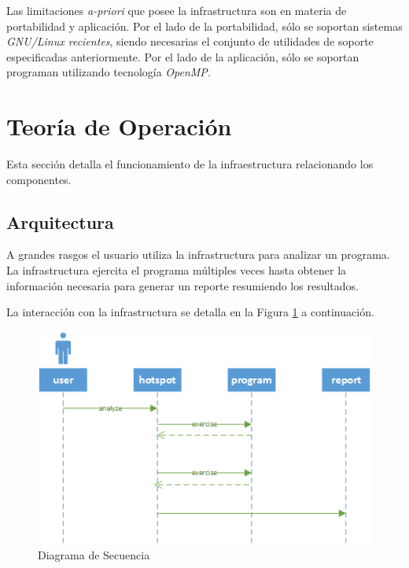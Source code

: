 \documentclass[a4paper]{report}
\begin{document}
\bigskip

Las limitaciones {\it a-priori} que posee la infrastructura son en materia de portabilidad y aplicación. Por el lado de la portabilidad, sólo se soportan sistemas {\it GNU/Linux recientes}, siendo necesarias el conjunto de utilidades de soporte especificadas anteriormente. Por el lado de la aplicación, sólo se soportan programan utilizando tecnología {\it OpenMP}.

\section{Teoría de Operación}

Esta sección detalla el funcionamiento de la infraestructura relacionando los componentes.

\subsection{Arquitectura}

A grandes rasgos el usuario utiliza la infrastructura para analizar un programa.
La infrastructura ejercita el programa múltiples veces hasta obtener la información necesaria para generar un reporte resumiendo los resultados.

\bigskip

La interacción con la infrastructura se detalla en la Figura \ref{fig:hotspot-seq} a continuación.

\begin{figure}[H]
\begin{center}
\includegraphics[width=\textwidth]{hotspot-seq.png}
\caption{Diagrama de Secuencia}
\label{fig:hotspot-seq}
\end{center}
\end{figure}
\end{document}
